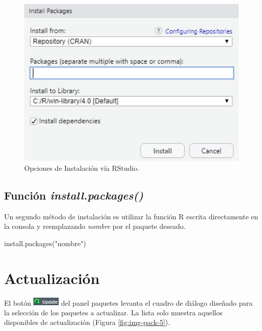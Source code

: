 \documentclass[
]{book}
\newenvironment{Shaded}{\begin{snugshade}}{\end{snugshade}}
\newcommand{\FunctionTok}[1]{\textcolor[rgb]{0.00,0.00,0.00}{#1}}
\newcommand{\NormalTok}[1]{#1}
\newcommand{\StringTok}[1]{\textcolor[rgb]{0.31,0.60,0.02}{#1}}
\begin{document}
\begin{figure}

{\centering \includegraphics[width=5.24in]{img/pack2} 

}

\caption{Opciones de Instalación vía RStudio.}\label{fig:img-pack-4}
\end{figure}

\hypertarget{pack-install-code}{%
\subsection{\texorpdfstring{Función \emph{install.packages()}}{Función install.packages()}}\label{pack-install-code}}

Un segundo método de instalación es utilizar la función R escrita directamente en la consola y reemplazando \emph{nombre} por el paquete deseado.


\begin{Shaded}
\begin{Highlighting}[]
\FunctionTok{install.packages}\NormalTok{(}\StringTok{"nombre"}\NormalTok{)}
\end{Highlighting}
\end{Shaded}

\hypertarget{pack-update}{%
\section{Actualización}\label{pack-update}}

El botón \includegraphics[width=0.52083in,height=\textheight]{img/pack5.png} del panel paquetes levanta el cuadro de diálogo diseñado para la selección de los paquetes a actualizar. La lista solo muestra aquellos disponibles de actualización (Figura \ref{fig:img-pack-5}).
\end{document}

